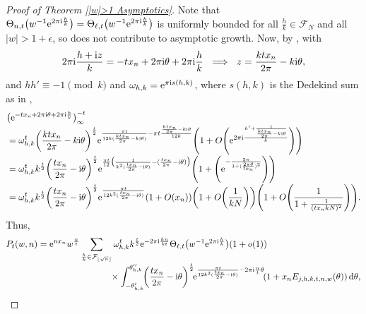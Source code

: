 \begin{proof}[Proof of Theorem \ref{|w|>1 Asymptotics}]
 Note that $\Theta_{n,t}\big(w^{-1}{\rm e}^{2\pi {\rm i} \frac{h}{k}}\big)=\Theta_{\ell,t}\big(w^{-1}{\rm e}^{2\pi {\rm i} \frac{h}{k}}\big)$ is uniformly bounded for all $\frac{h}{k} \in \mathcal{F}_N$ and all $|w|>1+\epsilon$, so does not contribute to asymptotic growth. Now, by \cite[equation~(5.2.2)]{Andrews}, with
 \begin{align*}
 2\pi {\rm i} \frac{h+{\rm i}z}{k}=-tx_n+2\pi {\rm i} \theta+2\pi {\rm i} \frac{h}{k} \ \implies\  z=\frac{ktx_n}{2\pi}-k{\rm i}\theta,
 \end{align*}
 and $hh' \equiv -1 \pmod{k}$ and $\omega_{h,k}={\rm e}^{\pi {\rm i} s(h,k)}$, where $s(h,k)$ is the Dedekind sum as in \cite[equation~(5.2.4)]{Andrews},
\begin{align*}
 &\big({\rm e}^{-tx_n+2\pi {\rm i} \theta+2\pi {\rm i} \frac{h}{k}}\big)_{\infty}^{-t} \\[-1mm]
 &{}= \omega_{h,k}^t \biggl(\frac{ktx_n}{2\pi}-k{\rm i}\theta\biggr)^{\frac{t}{2}}{\rm e}^{\frac{\pi t}{12k(\frac{ktx_n}{2\pi}-k{\rm i}\theta)}-\pi t\frac{\frac{ktx_n}{2\pi}-k{\rm i}\theta}{12k}}\Biggl(1+O\Biggl( {\rm e}^{2\pi {\rm i}\frac{h'+\frac{{\rm i}}{\frac{ktx_n}{2\pi}-k{\rm i}\theta}}{k}}\Biggr) \Biggr) \\[-1mm]
 &{}= \omega_{h,k}^t k^{\frac{t}{2}} \biggl(\frac{tx_n}{2\pi}-{\rm i}\theta\biggr)^{\frac{t}{2}}{\rm e}^{\frac{\pi t}{12}\big(\frac{1}{k^2(\frac{tx_n}{2\pi}-{\rm i}\theta)}-(\frac{tx_n}{2\pi}-{\rm i}\theta)\big)}\Biggl(1+\Biggl( {\rm e}^{- \frac{2\pi}{1+(\frac{2\pi\theta}{tx_n})^2}}\Biggr) \Biggr) \\[-1mm]
 &{}= \omega_{h,k}^t k^{\frac{t}{2}} \biggl(\frac{tx_n}{2\pi}-{\rm i}\theta\biggr)^{\frac{t}{2}}{\rm e}^{\frac{\pi t}{12k^2(\frac{tx_n}{2\pi}-{\rm i}\theta)}}(1+O(x_n)) \biggl(1+O\biggl(\frac{1}{kN}\biggr) \biggr) \Biggl(1+O\Biggl( \frac{1}{1+\frac{1}{(tx_nkN)^2}}\Biggr) \Biggr).
\end{align*}
Thus,
 \begin{align}
 P_t(w,n) &{}={\rm e}^{nx_n}w^{\frac{n}{t}} \sum_{\frac{h}{k} \in \mathcal{F}_{\lfloor \sqrt{n} \rfloor}} \omega_{h,k}^tk^{\frac{t}{2}}{\rm e}^{-2\pi {\rm i} \frac{hn}{kt}}\Theta_{\ell,t}\big(w^{-1}{\rm e}^{2\pi {\rm i} \frac{h}{k}}\big)(1+o(1)) \label{E:CircleMethodSeries}\\[-1mm]
 &\hphantom{={\rm e}^{nx_n}w^{\frac{n}{t}} \sum_{\frac{h}{k} \in \mathcal{F}_{\lfloor \sqrt{n} \rfloor}}}{}
 \times \int_{-\theta_{h,k}'}^{\theta_{h,k}''} \! \biggl(\frac{tx_n}{2\pi}-{\rm i}\theta\biggr)^{\frac{t}{2}}\!{\rm e}^{\frac{\pi t}{12k^2(\frac{tx_n}{2\pi}-{\rm i}\theta)}-2\pi {\rm i} \frac{n}{t} \theta}\! (1+x_n E_{j,h,k,t,n,w}(\theta))\, {\rm d}\theta, \nonumber

\end{align}
\end{proof}
